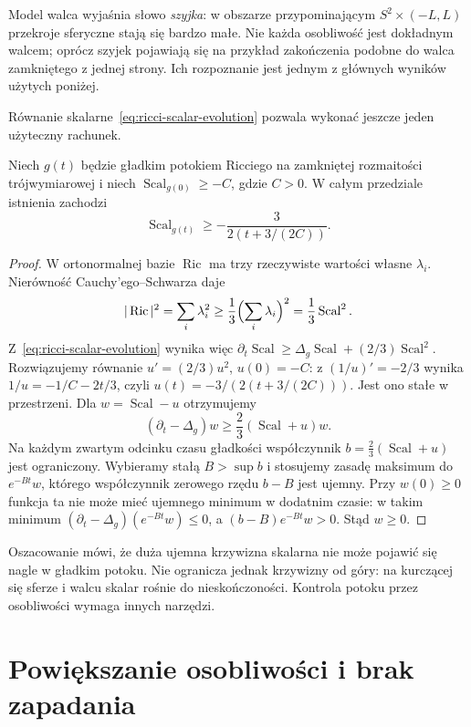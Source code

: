 Model walca wyjaśnia słowo \emph{szyjka}:
w obszarze przypominającym $S^2\times(-L,L)$
przekroje sferyczne stają się bardzo małe.
Nie każda osobliwość jest dokładnym walcem;
oprócz szyjek pojawiają się na przykład
zakończenia podobne do walca zamkniętego
z jednej strony. Ich rozpoznanie jest jednym
z głównych wyników użytych poniżej.

Równanie skalarne~\eqref{eq:ricci-scalar-evolution}
pozwala wykonać jeszcze jeden użyteczny rachunek.

\begin{stwierdzenie}
\label{prop:poincare3-skalar-dol}
Niech $g(t)$ będzie gładkim potokiem Ricciego
na zamkniętej rozmaitości trójwymiarowej i niech
$\operatorname{Scal}_{g(0)}\geq-C$, gdzie $C>0$.
W całym przedziale istnienia zachodzi
\begin{equation}\label{eq:poincare3-skalar-dol}
 \operatorname{Scal}_{g(t)}
 \geq-\frac{3}{2(t+3/(2C))}.
\end{equation}
\end{stwierdzenie}
\begin{proof}
W ortonormalnej bazie $\operatorname{Ric}$ ma trzy
rzeczywiste wartości własne $\lambda_i$. Nierówność
Cauchy'ego--Schwarza daje
\[
 |\operatorname{Ric}|^2=\sum_i\lambda_i^2
 \geq\frac13\Bigl(\sum_i\lambda_i\Bigr)^2
 =\frac13\operatorname{Scal}^2.
\]
Z~\eqref{eq:ricci-scalar-evolution} wynika więc
$\partial_t\operatorname{Scal}
 \geq\Delta_g\operatorname{Scal}
 +(2/3)\operatorname{Scal}^2$.
Rozwiązujemy równanie $u'=(2/3)u^2$, $u(0)=-C$:
z $(1/u)'=-2/3$ wynika
$1/u=-1/C-2t/3$, czyli $u(t)=-3/(2(t+3/(2C)))$.
Jest ono stałe w przestrzeni. Dla $w=\operatorname{Scal}-u$
otrzymujemy
\[
 (\partial_t-\Delta_g)w
 \geq\frac23(\operatorname{Scal}+u)w.
\]
Na każdym zwartym odcinku czasu gładkości współczynnik
$b=\tfrac23(\operatorname{Scal}+u)$ jest ograniczony.
Wybieramy stałą $B>\sup b$ i stosujemy zasadę maksimum
do $e^{-Bt}w$, którego współczynnik zerowego rzędu
$b-B$ jest ujemny. Przy $w(0)\geq0$ funkcja ta nie może
mieć ujemnego minimum w dodatnim czasie:
w takim minimum $(\partial_t-\Delta_g)(e^{-Bt}w)\leq0$,
a $(b-B)e^{-Bt}w>0$. Stąd $w\geq0$.
\end{proof}

Oszacowanie mówi, że duża ujemna krzywizna
skalarna nie może pojawić się nagle w gładkim
potoku. Nie ogranicza jednak krzywizny od góry:
na kurczącej się sferze i walcu skalar rośnie
do nieskończoności. Kontrola potoku przez
osobliwości wymaga innych narzędzi.

\section{Powiększanie osobliwości i brak zapadania}
\label{sec:poincare3-osobliwosci}

